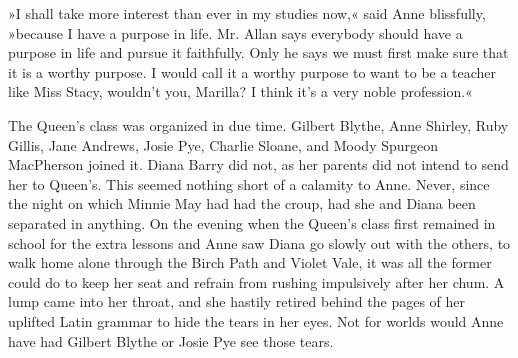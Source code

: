 »I shall take more interest than ever in my studies now,« said Anne blissfully, »because I have a purpose in life. Mr. Allan says everybody should have a purpose in life and pursue it faithfully. Only he says we must first make sure that it is a worthy purpose. I would call it a worthy purpose to want to be a teacher like Miss Stacy, wouldn’t you, Marilla? I think it’s a very noble profession.«

The Queen’s class was organized in due time. Gilbert Blythe, Anne Shirley, Ruby Gillis, Jane Andrews, Josie Pye, Charlie Sloane, and Moody Spurgeon MacPherson joined it. Diana Barry did not, as her parents did not intend to send her to Queen’s. This seemed nothing short of a calamity to Anne. Never, since the night on which Minnie May had had the croup, had she and Diana been separated in anything. On the evening when the Queen’s class first remained in school for the extra lessons and Anne saw Diana go slowly out with the others, to walk home alone through the Birch Path and Violet Vale, it was all the former could do to keep her seat and refrain from rushing impulsively after her chum. A lump came into her throat, and she hastily retired behind the pages of her uplifted Latin grammar to hide the tears in her eyes. Not for worlds would Anne have had Gilbert Blythe or Josie Pye see those tears.

